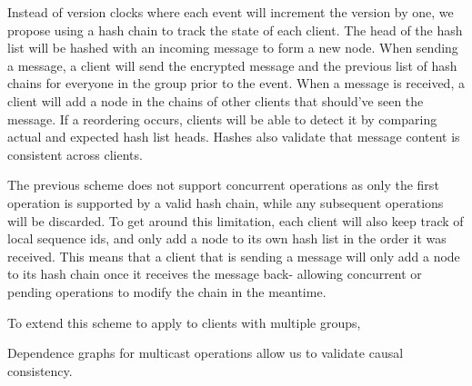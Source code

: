 Instead of version clocks where each event will increment the version by one, we propose using a hash chain to track the state of each client. The head of the hash list will be hashed with an incoming message to form a new node. When sending a message, a client will send the encrypted message and the previous list of hash chains for everyone in the group prior to the event. When a message is received, a client will add a node in the chains of other clients that should've seen the message. If a reordering occurs, clients will be able to detect it by comparing actual and expected hash list heads. Hashes also validate that message content is consistent across clients.

The previous scheme does not support concurrent operations as only the first operation is supported by a valid hash chain, while any subsequent operations will be discarded. To get around this limitation, each client will also keep track of local sequence ids, and only add a node to its own hash list in the order it was received. This means that a client that is sending a message will only add a node to its hash chain once it receives the message back- allowing concurrent or pending operations to modify the chain in the meantime. 

 To extend this scheme to apply to clients with multiple groups, 

\noindent 
{}

 
Dependence graphs for multicast operations allow us to validate causal consistency. 
